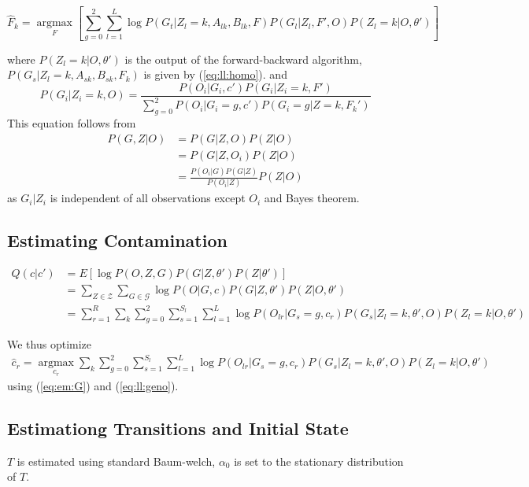 \documentclass[10pt,a4paper]{article}
\begin{document}
\begin{equation}
\hat{F}_k =\operatorname*{argmax}_F \left[ \sum_{g=0}^2\sum_{l=1}^L \log P(G_t | Z_l=k, A_{lk}, B_{lk}, F)  P(G_l|Z_l, F', O) P(Z_l=k | O, \theta') 
\right]\label{eq:opt:F}
\end{equation}

where $P(Z_l = k |O, \theta')$ is the output of the forward-backward algorithm, $P(G_s | Z_l=k, A_{sk}, B_{sk}, F_k)$ is given by (\ref{eq:ll:homo}).   and
\begin{equation}
P(G_i | Z_i=k, O) = \frac{P(O_i | G_i, c') P(G_i | Z_i=k, F')}{ \sum_{g=0}^2 P(O_i | G_i=g, c') P(G_i=g | Z=k, F_k') }
\label{eq:em:G}
\end{equation}
This equation follows from 
\begin{align}
P(G,Z| O) &= P(G|Z, O)P(Z|O)\nonumber\\
&=P(G | Z, O_i) P(Z | O)\nonumber\\
&= \frac{P(O_i | G) P(G|Z)}{P(O_i | Z)} P(Z|O)
\end{align}
as $G_i | Z_i$ is independent of all observations except $O_i$ and Bayes theorem.



\subsection{Estimating Contamination}
\begin{align}
Q(c|c' )&= E[\log P(O, Z, G )  P(G|Z, \theta') P(Z | \theta')]\nonumber\\
&=\sum_{Z \in \mathcal{Z}}\sum_{G \in \mathcal{G}} \log P( O | G, c) P(G|Z, \theta') P(Z | O, \theta')\nonumber\\
&=\sum_{r=1}^R\sum_k\sum_{g=0}^2 \sum_{s=1}^{S_l}\sum_{l=1}^L \log P(O_{lr} | G_s=g, c_r)  P(G_s|Z_l=k, \theta', O) P(Z_l=k | O, \theta')
\end{align}

We thus optimize
\begin{align}
\hat{c}_r = \operatorname*{argmax}_{c_r}\sum_k\sum_{g=0}^2 \sum_{s=1}^{S_l}\sum_{l=1}^L \log P(O_{lr} | G_s=g, c_r)  P(G_s|Z_l=k, \theta', O) P(Z_l=k | O, \theta')
\end{align}
using (\ref{eq:em:G}) and (\ref{eq:ll:geno}).
\subsection{Estimationg Transitions and Initial State}
$T$ is estimated using standard Baum-welch, $\alpha_0$ is set to the stationary distribution of $T$.
\end{document}
